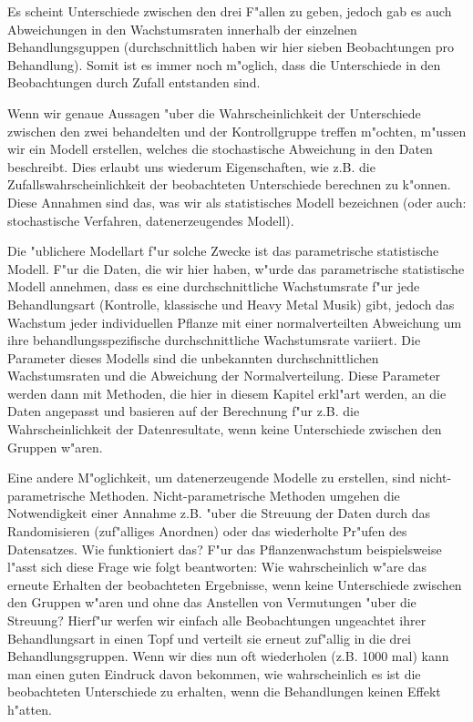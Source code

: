 \documentclass[a4paper,twoside]{tufte-book}\usepackage[]{graphicx}\usepackage[]{color}
\begin{document}
Es scheint Unterschiede zwischen den drei F"allen zu geben, jedoch gab es auch Abweichungen in den Wachstumsraten innerhalb der einzelnen Behandlungsguppen (durchschnittlich haben wir hier sieben Beobachtungen pro Behandlung). Somit ist es immer noch m"oglich, dass die Unterschiede in den Beobachtungen durch Zufall entstanden sind.

Wenn wir genaue Aussagen "uber die Wahrscheinlichkeit der Unterschiede zwischen den zwei behandelten und der Kontrollgruppe treffen m"ochten, m"ussen wir ein Modell erstellen, welches die stochastische Abweichung in den Daten beschreibt. Dies erlaubt uns wiederum Eigenschaften, wie z.B. die Zufallswahrscheinlichkeit der beobachteten Unterschiede berechnen zu k"onnen. Diese Annahmen sind das, was wir als statistisches Modell bezeichnen (oder auch: stochastische Verfahren, datenerzeugendes Modell). 

Die "ublichere Modellart f"ur solche Zwecke ist das parametrische statistische Modell. F"ur die Daten, die wir hier haben, w"urde das parametrische statistische Modell annehmen, dass es eine durchschnittliche Wachstumsrate f"ur jede Behandlungsart (Kontrolle, klassische und Heavy Metal Musik) gibt, jedoch das Wachstum jeder individuellen Pflanze mit einer normalverteilten Abweichung um ihre behandlungsspezifische durchschnittliche Wachstumsrate variiert. Die Parameter dieses Modells sind die unbekannten durchschnittlichen Wachstumsraten und die Abweichung der Normalverteilung. Diese Parameter werden dann mit Methoden, die hier in diesem Kapitel erkl"art werden, an die Daten angepasst und basieren auf der Berechnung f"ur z.B. die Wahrscheinlichkeit der Datenresultate, wenn keine Unterschiede zwischen den Gruppen w"aren.

Eine andere M"oglichkeit, um datenerzeugende Modelle zu erstellen, sind nicht-parametrische Methoden. Nicht-parametrische Methoden umgehen die Notwendigkeit einer Annahme z.B. "uber die Streuung der Daten durch das Randomisieren (zuf"alliges Anordnen) oder das wiederholte Pr"ufen des Datensatzes. Wie funktioniert das? F"ur das Pflanzenwachstum beispielsweise l"asst sich diese Frage wie folgt beantworten: Wie wahrscheinlich w"are das erneute Erhalten der beobachteten Ergebnisse, wenn keine Unterschiede zwischen den Gruppen w"aren und ohne das Anstellen von Vermutungen "uber die Streuung? Hierf"ur werfen wir einfach alle Beobachtungen ungeachtet ihrer Behandlungsart in einen Topf und verteilt sie erneut zuf"allig in die drei Behandlungsgruppen. Wenn wir dies nun oft wiederholen (z.B. 1000 mal) kann man einen guten Eindruck davon bekommen, wie wahrscheinlich es ist die beobachteten Unterschiede zu erhalten, wenn die Behandlungen keinen Effekt h"atten.
\end{document}
